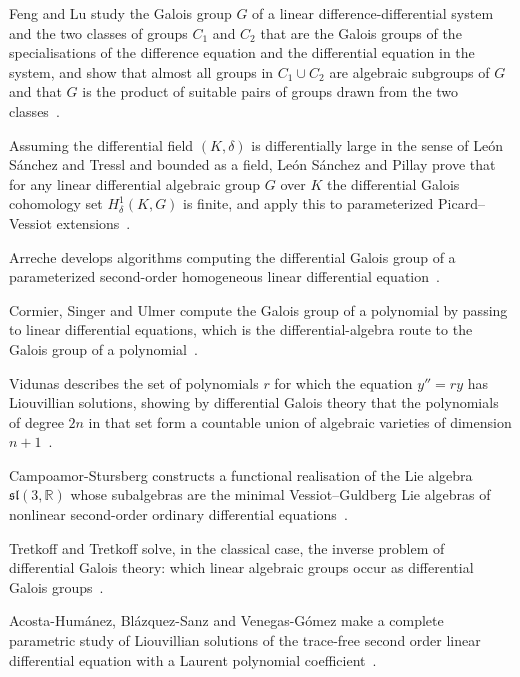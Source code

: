 Feng and Lu study the Galois group $G$ of a linear difference-differential system and the two classes of groups $C_1$ and $C_2$ that are the Galois groups of the specialisations of the difference equation and the differential equation in the system, and show that almost all groups in $C_1\cup C_2$ are algebraic subgroups of $G$ and that $G$ is the product of suitable pairs of groups drawn from the two classes~\cite{WlGaloisGroupsOfLinearDifference2023}.

Assuming the differential field $(K,\delta)$ is differentially large in the sense of Le\'on S\'anchez and Tressl and bounded as a field, Le\'on S\'anchez and Pillay prove that for any linear differential algebraic group $G$ over $K$ the differential Galois cohomology set $H^1_\delta(K,G)$ is finite, and apply this to parameterized Picard--Vessiot extensions~\cite{WlDifferentialGaloisCohomologyAn2021}.

Arreche develops algorithms computing the differential Galois group of a parameterized second-order homogeneous linear differential equation~\cite{WlComputingTheDifferentialGalois2014}.

Cormier, Singer and Ulmer compute the Galois group of a polynomial by passing to linear differential equations, which is the differential-algebra route to the Galois group of a polynomial~\cite{WlComputingTheGaloisGroupOfAPoly2000}.

Vidunas describes the set of polynomials $r$ for which the equation $y''=ry$ has Liouvillian solutions, showing by differential Galois theory that the polynomials of degree $2n$ in that set form a countable union of algebraic varieties of dimension $n+1$~\cite{WlDifferentialEquationsOfOrderTw1999}.

Campoamor-Stursberg constructs a functional realisation of the Lie algebra $\mathfrak{sl}(3,\mathbb{R})$ whose subalgebras are the minimal Vessiot--Guldberg Lie algebras of nonlinear second-order ordinary differential equations~\cite{WlAFunctionalRealizationOfSl3RPr2016}.

Tretkoff and Tretkoff solve, in the classical case, the inverse problem of differential Galois theory: which linear algebraic groups occur as differential Galois groups~\cite{WlSolutionOfTheInverseProblemOfD1979}.

Acosta-Hum\'anez, Bl\'azquez-Sanz and Venegas-G\'omez make a complete parametric study of Liouvillian solutions of the trace-free second order linear differential equation with a Laurent polynomial coefficient~\cite{WlLiouvillianSolutionsForSecondO2020}.

